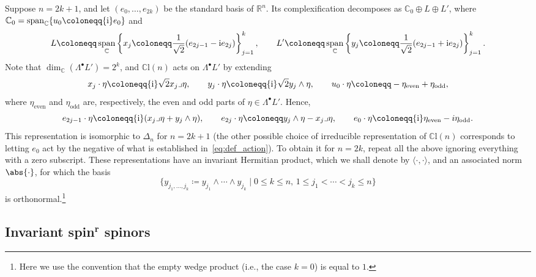 \documentclass[pdftex]{sigma}
\numberwithin{equation}{section}
\DeclareMathOperator{\vecspan}{span}
\begin{document}
		Suppose $n = 2k+1$, and let $(e_0,\dots,e_{2k})$ be the standard basis of $\mathbb{R}^n$. Its complexification decomposes as
$
			\mathbb{C}_0 \oplus L \oplus L' $,
		where $\mathbb{C}_0 = \vecspan_{\mathbb{C}}\{u_0 \coloneqq {\rm i} e_0\}$ and
		\begin{equation*}
			L \coloneqq \vecspan_{\mathbb{C}} \left\{ x_j \coloneqq \frac{1}{\sqrt{2}} ( e_{2j-1} - {\rm i} e_{2j} ) \right\}_{j=1}^{k} , \qquad L' \coloneqq \vecspan_{\mathbb{C}} \left\{ y_j \coloneqq \frac{1}{\sqrt{2}} ( e_{2j-1} + {\rm i} e_{2j} ) \right\}_{j=1}^{k} .
		\end{equation*}
		Note that $\dim_{\mathbb{C}}(\Lambda^{\bullet}L') = 2^k$, and $\mathbb{C}\mathrm{l}(n)$ acts on $\Lambda^{\bullet}L'$ by extending
		\[
			x_j \cdot \eta \coloneqq {\rm i}\sqrt{2} x_j \lrcorner \eta , \qquad y_j \cdot \eta \coloneqq {\rm i}\sqrt{2} y_j \wedge \eta , \qquad u_0 \cdot \eta \coloneqq -\eta_{\mathrm{even}} + \eta_{\mathrm{odd}} ,
		\]
		where $\eta_{\mathrm{even}}$ and $\eta_{\mathrm{odd}}$ are, respectively, the even and odd parts of $\eta \in \Lambda^{\bullet} L'$. Hence,
		\begin{equation}\label{eq:def_action}
			e_{2j-1} \cdot \eta \coloneqq {\rm i} ( x_j \lrcorner \eta + y_j \wedge \eta ) ,\qquad e_{2j} \cdot \eta \coloneqq y_j \wedge \eta - x_j \lrcorner \eta , \qquad e_0 \cdot \eta \coloneqq {\rm i} \eta_{\mathrm{even}} -i \eta_{\mathrm{odd}} .
		\end{equation}
		This representation is isomorphic to $\Delta_n$ for $n=2k+1$ (the other possible choice of irreducible representation of $\mathbb{C}\mathrm{l}(n)$ corresponds to letting $e_0$ act by the negative of what is established in~\eqref{eq:def_action}). To obtain it for $n=2k$, repeat all the above ignoring everything with a zero subscript. These representations have an invariant Hermitian product, which we shall denote by $\langle \cdot , \cdot \rangle$, and an associated norm $\abs{\cdot}$, for which the basis
		\[
 \{ y_{j_1, \dots, j_k} \coloneqq y_{j_1} \wedge \cdots \wedge y_{j_k} \mid 0 \leq k \leq n , \, 1 \leq j_1 < \cdots < j_k \leq n \}
		\]
		is orthonormal.\footnote{Here we use the convention that the empty wedge product (i.e., the case $k=0$) is equal to $1$.}
		
		\subsection[Invariant spin\^{}r spinors]{Invariant spin$^{\boldsymbol{r}}$ spinors}
		
\end{document}
